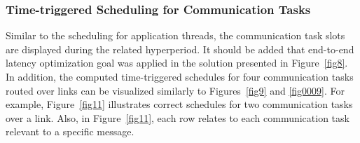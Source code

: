         
        
        \subsubsection{Time-triggered Scheduling for Communication Tasks}
        
        Similar to the scheduling for application threads, the communication task slots are displayed during the related hyperperiod. It should be added that end-to-end latency optimization goal was applied in the solution presented in Figure~\ref{fig8}. In addition, the computed time-triggered schedules for four communication tasks routed over links can be visualized similarly to Figures~\ref{fig9} and \ref{fig0009}. For example, Figure~\ref{fig11} illustrates correct schedules for two communication tasks over a link. Also, in Figure~\ref{fig11}, each row relates to each communication task relevant to a specific message.
        
        

    
    

    

